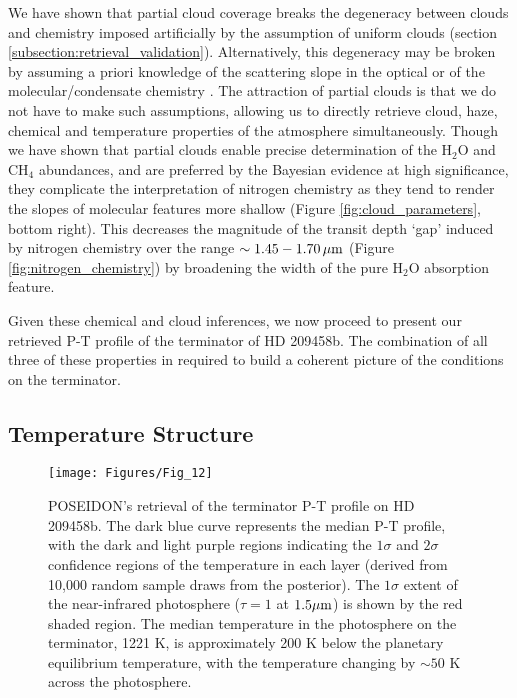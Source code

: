 \documentclass[fleqn,usenatbib]{mnras}
\begin{document}
We have shown that partial cloud coverage breaks the degeneracy between clouds and chemistry imposed artificially by the assumption of uniform clouds (section \ref{subsection:retrieval_validation}). Alternatively, this degeneracy may be broken by assuming a priori knowledge of the scattering slope in the optical \citep[e.g][]{Benneke2012} or of the molecular/condensate chemistry \citep{Benneke2015}. The attraction of partial clouds is that we do not have to make such assumptions, allowing us to directly retrieve cloud, haze, chemical and temperature properties of the atmosphere simultaneously. Though we have shown that partial clouds enable precise determination of the $\mathrm{H_{2}O}$ and  $\mathrm{CH_{4}}$ abundances, and are preferred by the Bayesian evidence at high significance, they complicate the interpretation of nitrogen chemistry as they tend to render the slopes of molecular features more shallow (Figure \ref{fig:cloud_parameters}, bottom right). This decreases the magnitude of the transit depth `gap' induced by nitrogen chemistry over the range $\sim 1.45-1.70 \,\hbox{$\mu$m}$ (Figure \ref{fig:nitrogen_chemistry}) by broadening the width of the pure $\mathrm{H_{2}O}$ absorption feature.

Given these chemical and cloud inferences, we now proceed to present our retrieved P-T profile of the terminator of HD 209458b. The combination of all three of these properties in required to build a coherent picture of the conditions on the terminator.

\subsection{Temperature Structure}\label{subsection:results_temperature_structure}

\begin{figure}
	\texttt{[image: Figures/Fig\_12]}
    \caption{POSEIDON's retrieval of the terminator P-T profile on HD 209458b. The dark blue curve represents the median P-T profile, with the dark and light purple regions indicating the $1\sigma$ and $2\sigma$ confidence regions of the temperature in each layer (derived from 10,000 random sample draws from the posterior). The  $1\sigma$ extent of the near-infrared photosphere ($\tau = 1$ at $1.5 \hbox{$\mu$m}$) is shown by the red shaded region. The median temperature in the photosphere on the terminator, 1221 K, is approximately 200 K below the planetary equilibrium temperature, with the temperature changing by $\sim 50$ K across the photosphere.}
    \label{fig:Sing_PT}
\end{figure}
\end{document}
